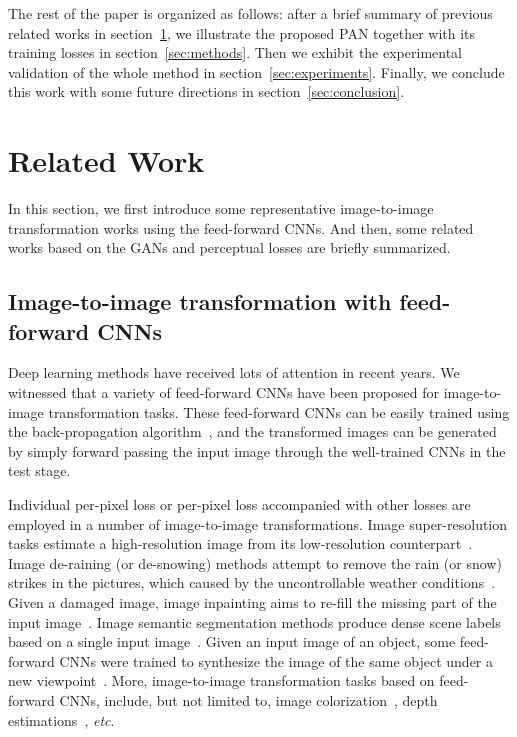 \documentclass{article}
\newcommand{\etc}{\textit{etc}}
\begin{document}
The rest of the paper is organized as follows: after a brief
summary of previous related works in section~\ref{sec:background}, we illustrate
the proposed PAN together with its training losses
in section~\ref{sec:methods}. Then we exhibit the experimental validation
of the whole method in section~\ref{sec:experiments}. Finally, we conclude
this work with some future directions in section~\ref{sec:conclusion}.

\section{Related Work}
\label{sec:background}

In this section, we first introduce some representative image-to-image transformation works using the feed-forward CNNs. And then, some related works based on the GANs and perceptual losses are briefly summarized.

\subsection{Image-to-image transformation with feed-forward CNNs}

Deep learning methods have received lots of attention in recent years. We witnessed that a variety of feed-forward CNNs have been proposed for image-to-image transformation tasks. These feed-forward CNNs can be easily trained using the back-propagation algorithm~\cite{rumelhart1988learning}, and the transformed images can be generated by simply forward passing the input image through the well-trained CNNs in the test stage.

Individual per-pixel loss or per-pixel loss accompanied with other losses are employed in a number of image-to-image transformations. Image super-resolution tasks estimate a high-resolution image from its low-resolution counterpart~\cite{dong2016image, johnson2016perceptual, ledig2016photo}. Image de-raining (or de-snowing) methods attempt to remove the rain (or snow) strikes in the pictures, which caused by the uncontrollable weather conditions~\cite{fu2016clearing, eigen2013restoring, yang2016joint, zhang2017image}. Given a damaged image, image inpainting aims to re-fill the missing part of the input image~\cite{pathak2016context, li2017generative}. Image semantic segmentation methods produce dense scene labels based on a single input image~\cite{farabet2013learning, noh2015learning, long2015fully, eigen2015predicting}. Given an input image of an object, some feed-forward CNNs were trained to synthesize the image of the same object under a new viewpoint~\cite{yang2015weakly,tatarchenko2016multi}. More, image-to-image transformation tasks based on feed-forward CNNs, include, but not limited to, image colorization~\cite{cheng2015deep}, depth estimations~\cite{eigen2014depth,eigen2015predicting}, \etc.
\end{document}
